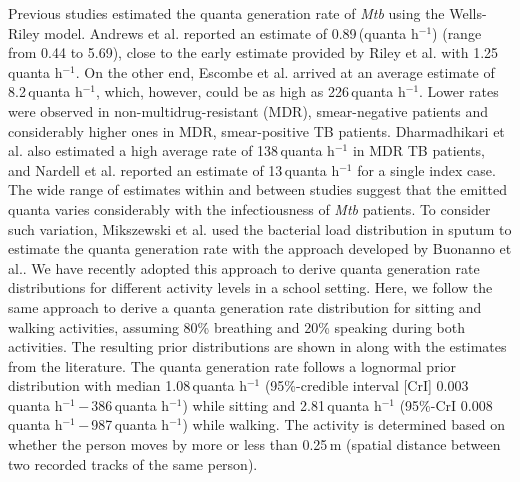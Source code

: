 \documentclass[fleqn,11pt]{wlscirep_supp}
\begin{document}
Previous studies estimated the quanta generation rate of \emph{Mtb} using the Wells-Riley model\cite{Andrews2014JID,Riley1962ARRD,Escombe2008PLoSMed,Nardell1991ARRD,Dharmadhikari2012AJRCCM}. Andrews et al.\cite{Andrews2014JID} reported an estimate of 0.89\,(quanta h$^{-1}$) (range from 0.44 to 5.69), close to the early estimate provided by Riley et al.\cite{Riley1962ARRD} with 1.25\,quanta h$^{-1}$. On the other end, Escombe et al.\cite{Escombe2008PLoSMed} arrived at an average estimate of 8.2\,quanta h$^{-1}$, which, however, could be as high as 226\,quanta h$^{-1}$. Lower rates were observed in non-multidrug-resistant (MDR), smear-negative patients and considerably higher ones in MDR, smear-positive TB patients\cite{Escombe2008PLoSMed}. Dharmadhikari et al.\cite{Dharmadhikari2012AJRCCM} also estimated a high average rate of 138\,quanta h$^{-1}$ in MDR TB patients, and Nardell et al.\cite{Nardell1991ARRD} reported an estimate of 13\,quanta h$^{-1}$ for a single index case. The wide range of estimates within and between studies suggest that the emitted quanta varies considerably with the infectiousness of \emph{Mtb} patients\cite{Wurie2016BMJ}. To consider such variation, Mikszewski et al.\cite{Mikszewski2021GF} used the bacterial load distribution in sputum to estimate the quanta generation rate with the approach developed by Buonanno et al.\cite{Buonanno2020EI}. We have recently adopted this approach to derive quanta generation rate distributions for different activity levels in a school setting\cite{Banholzer2024PGPH}. Here, we follow the same approach to derive a quanta generation rate distribution for sitting and walking activities, assuming 80\% breathing and 20\% speaking during both activities. The resulting prior distributions are shown in  along with the estimates from the literature. The quanta generation rate follows a lognormal prior distribution with median 1.08\,quanta h$^{-1}$ (95\%-credible interval [CrI] 0.003\,quanta h$^{-1}$\,$-$\,386\,quanta h$^{-1}$) while sitting and 2.81\,quanta h$^{-1}$ (95\%-CrI 0.008\,quanta h$^{-1}$\,$-$\,987\,quanta h$^{-1}$) while walking. The activity is determined based on whether the person moves by more or less than 0.25\,m (spatial distance between two recorded tracks of the same person). 
\end{document}
